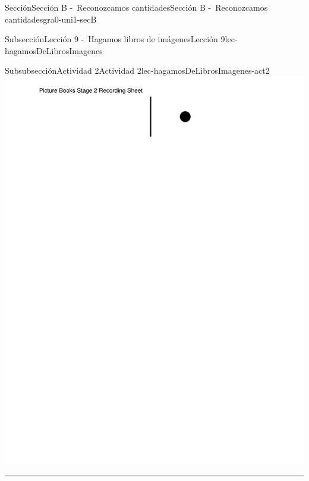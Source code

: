 \begin{sectionptx}{Sección}{Sección B -~Reconozcamos cantidades}{}{Sección B -~Reconozcamos cantidades}{}{}{gra0-uni1-secB}
\begin{subsectionptx}{Subsección}{Lección 9 -~Hagamos libros de imágenes}{}{Lección 9}{}{}{lec-hagamosDeLibrosImagenes}
\begin{subsubsectionptx}{Subsubsección}{Actividad 2}{}{Actividad 2}{}{}{lec-hagamosDeLibrosImagenes-act2}
\includegraphics[page=4, rotate=90, trim=90 35 35 35, clip, width=\linewidth, center]{external/blm/pdf-source/center-picture-books-k-5-stage-2-create-picture-books-stage-2-recording-sheet.pdf}
\hrule

\end{subsubsectionptx}
\end{subsectionptx}
\end{sectionptx}
